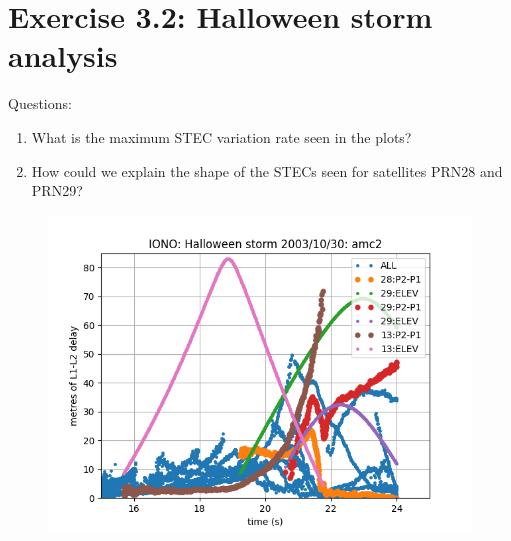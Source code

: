 \section{Exercise 3.2: Halloween storm analysis}

Questions:
\begin{enumerate}
\item What is the maximum STEC variation rate seen in the plots?
\item How could we explain the shape of the STECs seen for satellites PRN28 and PRN29?
\end{enumerate}



\begin{figure}[H]
        \centering
        \includegraphics[scale=0.52]{sources/Figures/FIG_2/TUT2_Ex3.2b.png}
        \caption{}
        \label{fig:}
\end{figure}